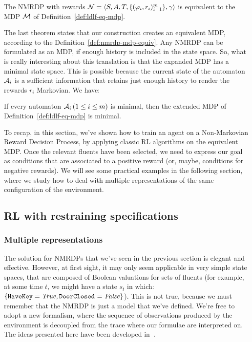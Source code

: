 \begin{theorem}
	\cite{bib:degiacomo-logic-nmrdp} The NMRDP with \ldl{} rewards $\mathcal{N} =
	{\langle S, A, T, \{(\varphi_i, r_i)_{i=1}^m\}, \gamma \rangle}$ is
	equivalent to the MDP $\mathcal{M}$ of Definition~\ref{def:ldlf-eq-mdp}.
\end{theorem}
The last theorem states that our construction creates an equivalent MDP,
according to the Definition~\ref{def:nmrdp-mdp-equiv}. Any NMRDP can be
formulated as an MDP, if enough history is included in the state space. So,
what is really interesting about this translation is that the expanded MDP has
a minimal state space. This is possible because the current state of the
automaton~$\mathcal{A}_i$ is a sufficient information that retains just enough
history to render the rewards $r_i$ Markovian. We have:
\begin{theorem}
	\cite{bib:degiacomo-logic-nmrdp} If every automaton $\mathcal{A}_i \,(1 \le i
	\le m)$ is minimal, then the extended MDP of
	Definition~\ref{def:ldlf-eq-mdp} is minimal.
\end{theorem}

To recap, in this section, we've shown how to train an agent on a
Non-Markovian Reward Decision Process, by applying classic RL algorithms on
the equivalent MDP. Once the relevant fluents have been selected, we need to
express our goal as \ldl{} conditions that are associated to a positive reward
(or, maybe, conditions for negative rewards). We will see some practical
examples in the following section, where we study how to deal with multiple
representations of the same configuration of the environment. 


\subsection[RL with LDLf restraining specifications]%
{RL with \ldl{} restraining specifications}

\label{sec:rb}

\subsubsection{Multiple representations}

The solution for NMRDPs that we've seen in the previous section is elegant and
effective. However, at first sight, it may only seem applicable in very simple
state spaces, that are composed of Boolean valuations for sets of fluents
(for example, at some time $t$, we might have a state $s_t$ in which:
$\{\text{\texttt{HaveKey}} = \text{\textit{True}}, \text{\texttt{DoorClosed} =
\text{\textit{False}}}\}$). This is not true, because we must remember that the NMRDP
is just a model that we've defined. We're free to adopt a new formalism, where
the sequence of observations produced by the environment is decoupled from the
trace where our formulae are interpreted on. The ideas presented here have
been developed in~\cite{bib:bolt}.

